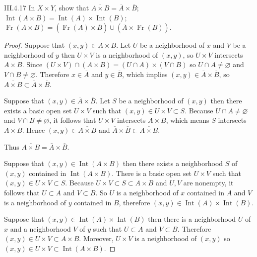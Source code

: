 \begin{problem}{III.4.17}
In \(X\times Y\), show that \( \overline{A \times B} = \overline{A} \times \overline{B} \); \( \operatorname{Int}(A \times B) = \operatorname{Int}(A) \times \operatorname{Int}(B) \); \( \operatorname{Fr}(A \times B) = (\operatorname{Fr}(A) \times \overline{B}) \cup (\overline{A} \times \operatorname{Fr}(B)) \).
\end{problem}

\begin{proof}
    Suppose that \( (x, y) \in \overline{A \times B} \). Let \( U \) be a neighborhood of \(x\) and \(V\) be a neighborhood of \(y\) then \( U \times V \) is a neighborhood of \( (x, y) \), so \( U \times V \) intersects \( A \times B \). Since \( (U \times V) \cap (A \times B) = (U \cap A) \times (V \cap B) \) so \( U \cap A \ne \varnothing \) and \( V \cap B \ne \varnothing \). Therefore \( x \in \overline{A} \) and \( y \in \overline{B} \), which implies \( (x, y) \in \overline{A} \times \overline{B} \), so \( \overline{A \times B} \subset \overline{A} \times \overline{B} \).

    Suppose that \( (x, y) \in \overline{A} \times \overline{B} \). Let \( S \) be a neighborhood of \( (x, y) \) then there exists a basic open set \( U \times V \) such that \( (x, y) \in U \times V \subset S \). Because \( U \cap A \ne \varnothing \) and \( V \cap B \ne \varnothing \), it follows that \( U \times V \) intersects \( A \times B \), which means \( S \) intersects \( A \times B \). Hence \( (x, y) \in \overline{A \times B} \) and \( \overline{A} \times \overline{B} \subset \overline{A \times B} \).

    Thus \( \overline{A \times B} = \overline{A} \times \overline{B} \).

    \hrulefill%

    Suppose that \( (x, y) \in \operatorname{Int}(A\times B) \) then there exists a neighborhood \(S\) of \( (x, y) \) contained in \( \operatorname{Int}(A\times B) \). There is a basic open set \( U\times V \) such that \( (x, y) \in U \times V \subset S \). Because \( U \times V \subset S \subset A \times B \) and \( U, V \) are nonempty, it follows that \( U \subset A \) and \( V \subset B \). So \( U \) is a neighborhood of \( x \) contained in \( A \) and \( V \) is a neighborhood of \(y\) contained in \(B\), therefore \( (x, y) \in \operatorname{Int}(A) \times \operatorname{Int}(B) \).

    Suppose that \( (x, y) \in \operatorname{Int}(A) \times \operatorname{Int}(B) \) then there is a neighborhood \(U\) of \(x\) and a neighborhood \(V\) of \(y\) such that \( U \subset A \) and \( V \subset B \). Therefore \( (x, y) \in U\times V \subset A\times B \). Moreover, \( U\times V \) is a neighborhood of \( (x, y) \) so \( (x, y) \in U \times V \subset \operatorname{Int}(A \times B) \).


\end{proof}
